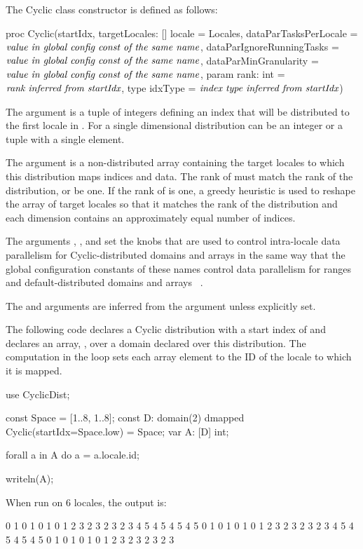 The Cyclic class constructor is defined as follows:
\begin{chapel}
proc Cyclic(startIdx,
           targetLocales: [] locale = Locales,
           dataParTasksPerLocale = $\mbox{{\it value in global config const of the same name}}$,
           dataParIgnoreRunningTasks = $\mbox{{\it value in global config const of the same name}}$,
           dataParMinGranularity = $\mbox{{\it value in global config const of the same name}}$,
           param rank: int = $\mbox{{\it rank inferred from startIdx}}$,
           type idxType = $\mbox{{\it index type inferred from startIdx}}$)
\end{chapel}

The argument  is a tuple of integers defining an index that
will be distributed to the first locale in . For a single
dimensional distribution  can be an integer or a tuple with a
single element.

The argument  is a non-distributed array
containing the target locales to which this distribution maps indices
and data.  The rank of  must match the rank of the
distribution, or be one.  If the rank of
 is one, a greedy heuristic is used to reshape the
array of target locales so that it matches the rank of the
distribution and each dimension contains an approximately equal number
of indices.

The
arguments , ,
and  set the knobs that are used to
control intra-locale data parallelism for Cyclic-distributed domains
and arrays in the same way that the global configuration constants of
these names control data parallelism for ranges and
default-distributed domains and arrays ~.

The  and  arguments are inferred from the
 argument unless explicitly set.

\begin{example}
The following code declares a Cyclic distribution with a start index
of  and declares an array, , over a domain
declared over this distribution.  The computation in the 
loop sets each array element to the ID of the locale to which it is
mapped.
\begin{chapel}
use CyclicDist;

const Space = [1..8, 1..8];
const D: domain(2) dmapped Cyclic(startIdx=Space.low) = Space;
var A: [D] int;

forall a in A do
  a = a.locale.id;

writeln(A);
\end{chapel}
When run on 6 locales, the output is:
\begin{chapel}
0 1 0 1 0 1 0 1
2 3 2 3 2 3 2 3
4 5 4 5 4 5 4 5
0 1 0 1 0 1 0 1
2 3 2 3 2 3 2 3
4 5 4 5 4 5 4 5
0 1 0 1 0 1 0 1
2 3 2 3 2 3 2 3
\end{chapel}
\end{example}


